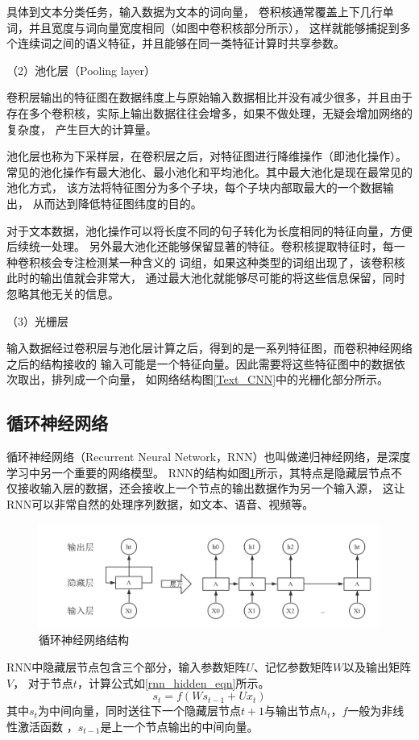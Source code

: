 \documentclass{standalone}
\begin{document}
具体到文本分类任务，输入数据为文本的词向量，
卷积核通常覆盖上下几行单词，并且宽度与词向量宽度相同（如图中卷积核部分所示），
这样就能够捕捉到多个连续词之间的语义特征，并且能够在同一类特征计算时共享参数。

（2）池化层（Pooling layer）

卷积层输出的特征图在数据纬度上与原始输入数据相比并没有减少很多，并且由于
存在多个卷积核，实际上输出数据往往会增多，如果不做处理，无疑会增加网络的复杂度，
产生巨大的计算量。

池化层也称为下采样层，在卷积层之后，对特征图进行降维操作（即池化操作）。
常见的池化操作有最大池化、最小池化和平均池化。其中最大池化是现在最常见的池化方式，
该方法将特征图分为多个子块，每个子块内部取最大的一个数据输出，
从而达到降低特征图纬度的目的。

对于文本数据，池化操作可以将长度不同的句子转化为长度相同的特征向量，方便后续统一处理。
另外最大池化还能够保留显著的特征。卷积核提取特征时，每一种卷积核会专注检测某一种含义的
词组，如果这种类型的词组出现了，该卷积核此时的输出值就会非常大，
通过最大池化就能够尽可能的将这些信息保留，同时忽略其他无关的信息。

（3）光栅层

输入数据经过卷积层与池化层计算之后，得到的是一系列特征图，而卷积神经网络之后的结构接收的
输入可能是一个特征向量。因此需要将这些特征图中的数据依次取出，排列成一个向量，
如网络结构图\ref{Text_CNN}中的光栅化部分所示。


\subsection{循环神经网络}
\label{rnn_section}
循环神经网络（Recurrent Neural Network，RNN）也叫做递归神经网络，是深度学习中另一个重要的网络模型。
RNN的结构如图\ref{RNN}所示，其特点是隐藏层节点不仅接收输入层的数据，还会接收上一个节点的输出数据作为另一个输入源，
这让RNN可以非常自然的处理序列数据，如文本、语音、视频等。
\begin{figure}[h]
    \includegraphics[scale=0.4]{picture/RNN.png}
    \caption{循环神经网络结构}
    \label{RNN}
\end{figure}
RNN中隐藏层节点包含三个部分，输入参数矩阵$U$、记忆参数矩阵$W$以及输出矩阵$V$，
对于节点$t$，计算公式如\ref{rnn_hidden_eqn}所示。
\begin{equation}
    s_t=f\left ( Ws_{t-1}+Ux_t \right )
    \label{rnn_hidden_eqn}
\end{equation}
其中$s_t$为中间向量，同时送往下一个隐藏层节点$t+1$与输出节点$h_t$，$f$一般为非线性激活函数
，$s_{t-1}$是上一个节点输出的中间向量。
\end{document}

